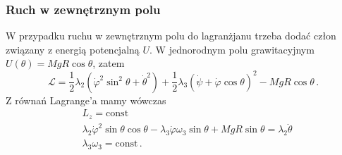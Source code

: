 \documentclass[../main.tex]{subfiles}
\begin{document}
    \subsubsection*{Ruch w zewnętrznym polu}
    W przypadku ruchu w zewnętrznym polu do lagranżjanu trzeba dodać człon związany z energią
    potencjalną \(U\). W jednorodnym polu grawitacyjnym \(U(\theta)=MgR\cos\theta\), zatem
    \begin{equation*}
        \mathcal{L}=\frac{1}{2}\lambda_2(\dot{\varphi}^2\sin^2\theta+\dot{\theta}^2)+\frac{1}{2}\lambda_3(\dot\psi+\dot\varphi\cos\theta)^2-MgR\cos\theta\,.
    \end{equation*}
    Z równań Lagrange'a mamy wówczas
    \begin{equation*}
        \begin{split}
            &L_z=\text{const}\\
            &\lambda_2\dot{\varphi}^2\sin\theta\cos\theta-\lambda_3\dot{\varphi}\omega_3\sin\theta+MgR\sin\theta=\lambda_2\ddot\theta\\
            &\lambda_3\omega_3=\text{const}\,.
        \end{split}
    \end{equation*}
\end{document}
